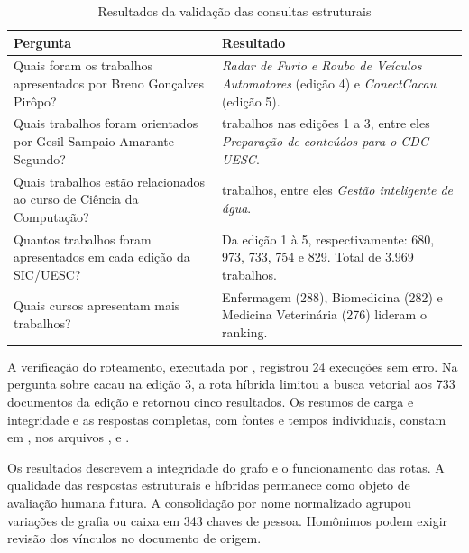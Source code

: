 \begin{table}[!htbp]
\centering
\caption{Resultados da validação das consultas estruturais}
\label{tab:validacao-grafo-estrutural}
\small
\setlength{\tabcolsep}{5pt}
\renewcommand{\arraystretch}{1.12}
\begin{tabularx}{\textwidth}{>{\raggedright\arraybackslash}p{}>{\raggedright\arraybackslash}X}
\toprule
\textbf{Pergunta} & \textbf{Resultado} \\ \midrule
Quais foram os trabalhos apresentados por Breno Gonçalves Pirôpo? & \textit{Radar de Furto e Roubo de Veículos Automotores} (edição 4) e \textit{ConectCacau} (edição 5). \\
Quais trabalhos foram orientados por Gesil Sampaio Amarante Segundo? & 28 trabalhos nas edições 1 a 3, entre eles \textit{Preparação de conteúdos para o CDC-UESC}. \\
Quais trabalhos estão relacionados ao curso de Ciência da Computação? & 124 trabalhos, entre eles \textit{Gestão inteligente de água}. \\
Quantos trabalhos foram apresentados em cada edição da SIC/UESC? & Da edição 1 à 5, respectivamente: 680, 973, 733, 754 e 829. Total de 3.969 trabalhos. \\
Quais cursos apresentam mais trabalhos? & Enfermagem (288), Biomedicina (282) e Medicina Veterinária (276) lideram o ranking. \\ \bottomrule
\end{tabularx}
\end{table}

A verificação do roteamento, executada por , registrou 24 execuções sem erro. Na pergunta sobre cacau na edição 3, a rota híbrida limitou a busca vetorial aos 733 documentos da edição e retornou cinco resultados. Os resumos de carga e integridade e as respostas completas, com fontes e tempos individuais, constam em , nos arquivos ,  e .

Os resultados descrevem a integridade do grafo e o funcionamento das rotas. A qualidade das respostas estruturais e híbridas permanece como objeto de avaliação humana futura. A consolidação por nome normalizado agrupou variações de grafia ou caixa em 343 chaves de pessoa. Homônimos podem exigir revisão dos vínculos no documento de origem.

